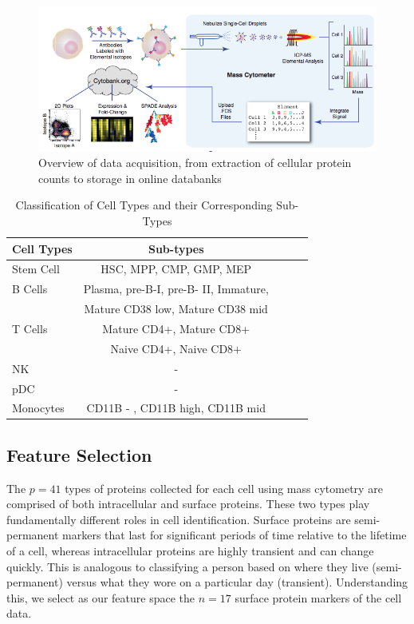 \documentclass{article}
\begin{document}
\begin{figure}
\vskip 0.2in
\begin{center}
\centerline{\includegraphics[width=\columnwidth]{DataAcquisition}}
\caption{Overview of data acquisition, from extraction of cellular protein counts to storage in online databanks}
\end{center}
\label{dataacquisition}
\vskip -0.2in
\end{figure}  

\begin{table}
\caption{Classification of Cell Types and their Corresponding Sub-Types}
\label{table_cell_type}
\vskip 0.15in
\begin{center}
\begin{small}
\begin{sc}
\begin{tabular}{lcccr}
\hline
\abovespace\belowspace
Cell Types & Sub-types  \\
\hline
\abovespace
Stem Cell	&  HSC, MPP, CMP, GMP, MEP \\
B Cells 	& Plasma, pre-B-I, pre-B- II, Immature, \\ 
		&			Mature CD38 low, Mature CD38 mid\\
T Cells	& Mature CD4+, Mature CD8+ \\
		& Naive CD4+, Naive CD8+  \\
NK		& -   \\
pDC		& - \\
\belowspace
Monocytes & CD11B - , CD11B high, CD11B mid \\
\hline
\end{tabular}
\end{sc}
\end{small}
\end{center}
\vskip -0.1in
\end{table}

\subsection{Feature Selection}
The $p=41$ types of proteins collected for each cell using mass cytometry are comprised of both intracellular and surface proteins. These two types play fundamentally different roles in cell identification. Surface proteins are semi-permanent markers that last for significant periods of time relative to the lifetime of a cell, whereas intracellular proteins are highly transient and can change quickly. This is analogous to classifying a person based on where they live (semi-permanent) versus what they wore on a particular day (transient). Understanding this, we select as our feature space the $n=17$ surface protein markers of the cell data.
\end{document}

